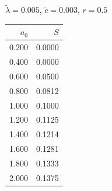 \documentclass[11pt,a4paper]{article}
\begin{document}
\begin{minipage}[t]{\textwidth}
\begin{minipage}[t]{0.32\textwidth}
        \footnotesize
        \begin{flushleft}$\tilde{\lambda}=0.005$, $\tilde{c}=0.003$, $r=0.5$\end{flushleft}
        \begin{tabular}[t]{rr}
            $a_0$ & $S$ \\
            \hline
             0.200 & 0.0000 \\
             0.400 & 0.0000 \\
             0.600 & 0.0500 \\
             0.800 & 0.0812 \\
             1.000 & 0.1000 \\
             1.200 & 0.1125 \\
             1.400 & 0.1214 \\
             1.600 & 0.1281 \\
             1.800 & 0.1333 \\
             2.000 & 0.1375 \\
        \end{tabular}
    \end{minipage}
\end{minipage}
\end{document}
